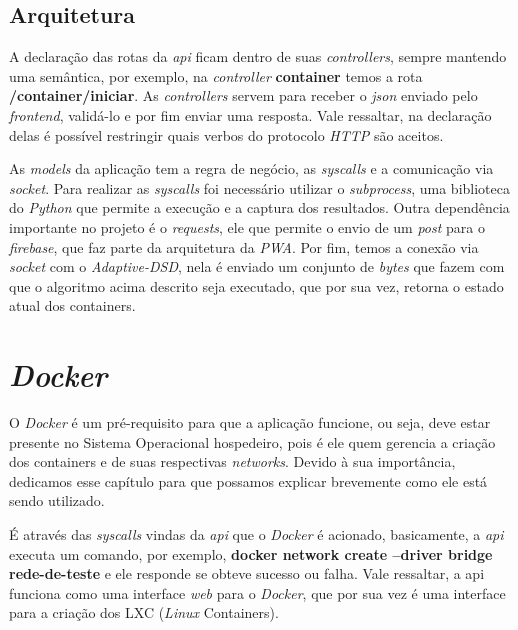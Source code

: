 \subsection{Arquitetura}

A declaração das rotas da \textit{api} ficam dentro de suas \textit{controllers}, sempre mantendo uma semântica, por exemplo, na \textit{controller} \textbf{container} temos a rota \textbf{/container/iniciar}. As \textit{controllers} servem para receber o \textit{json} enviado pelo \textit{frontend}, validá-lo e por fim enviar uma resposta. Vale ressaltar, na declaração delas é possível restringir quais verbos do protocolo \textit{HTTP} são aceitos.

As \textit{models} da aplicação tem a regra de negócio, as \textit{syscalls} e a comunicação via \textit{socket}. Para realizar as \textit{syscalls} foi necessário utilizar o \textit{subprocess}, uma biblioteca do \textit{Python} que permite a execução e a captura dos resultados. Outra dependência importante no projeto é o \textit{requests}, ele que permite o envio de um \textit{post} para o \textit{firebase}, que faz parte da arquitetura da \textit{PWA}. Por fim, temos a conexão via \textit{socket} com o \textit{Adaptive-DSD}, nela é enviado um conjunto de \textit{bytes} que fazem com que o algoritmo acima descrito seja executado, que por sua vez, retorna o estado atual dos containers.



\section{\textit{Docker}}
\label{sec:docker}

O \textit{Docker} é um pré-requisito para que a aplicação funcione, ou seja, deve estar presente no Sistema Operacional hospedeiro, pois é ele quem gerencia a criação dos containers e de suas respectivas \textit{networks}. Devido à sua importância, dedicamos esse capítulo para que possamos explicar brevemente como ele está sendo utilizado.

É através das \textit{syscalls} vindas da \textit{api} que o \textit{Docker} é acionado, basicamente, a \textit{api} executa um comando, por exemplo, \textbf{docker network create --driver bridge rede-de-teste} e ele responde se obteve sucesso ou falha. Vale ressaltar, a api funciona como uma interface \textit{web} para o \textit{Docker}, que por sua vez é uma interface para a criação dos LXC (\textit{Linux} Containers).

